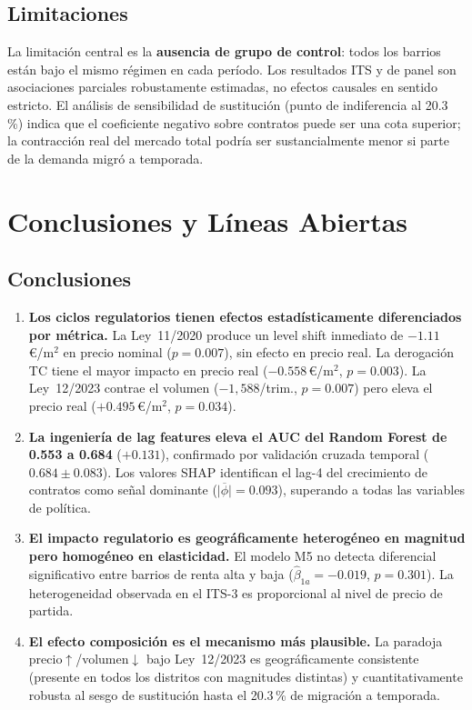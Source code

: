 \documentclass[10pt,a4paper,twocolumn]{article}
\begin{document}
\subsection{Limitaciones}

La limitación central es la \textbf{ausencia de grupo de control}: todos los barrios
están bajo el mismo régimen en cada período. Los resultados ITS y de panel son
asociaciones parciales robustamente estimadas, no efectos causales en sentido estricto.
El análisis de sensibilidad de sustitución (punto de indiferencia al 20.3\,\%) indica
que el coeficiente negativo sobre contratos puede ser una cota superior; la contracción
real del mercado total podría ser sustancialmente menor si parte de la demanda migró
a temporada.

\section{Conclusiones y Líneas Abiertas}
\label{sec:conclusiones}

\subsection{Conclusiones}

\begin{enumerate}[leftmargin=*,label=\textbf{C\arabic*.},itemsep=3pt]

\item \textbf{Los ciclos regulatorios tienen efectos estadísticamente diferenciados
por métrica.} La Ley~11/2020 produce un level shift inmediato de $-1.11$\,\euro/m$^2$
en precio nominal ($p{=}0.007$), sin efecto en precio real. La derogación TC tiene el
mayor impacto en precio real ($-0.558$\,\euro/m$^2$, $p{=}0.003$). La Ley~12/2023
contrae el volumen ($-1{,}588$/trim., $p{=}0.007$) pero eleva el precio real
($+0.495$\,\euro/m$^2$, $p{=}0.034$).

\item \textbf{La ingeniería de lag features eleva el AUC del Random Forest de 0.553
a 0.684} ($+0.131$), confirmado por validación cruzada temporal ($0.684\pm 0.083$).
Los valores SHAP identifican el lag-4 del crecimiento de contratos como señal
dominante ($\overline{|\phi|}{=}0.093$), superando a todas las variables de política.

\item \textbf{El impacto regulatorio es geográficamente heterogéneo en magnitud pero
homogéneo en elasticidad.} El modelo M5 no detecta diferencial significativo entre
barrios de renta alta y baja ($\hat\beta_{1a}{=}{-}0.019$, $p{=}0.301$). La
heterogeneidad observada en el ITS-3 es proporcional al nivel de precio de partida.

\item \textbf{El efecto composición es el mecanismo más plausible.} La paradoja
precio$\uparrow$/volumen$\downarrow$ bajo Ley~12/2023 es geográficamente consistente
(presente en todos los distritos con magnitudes distintas) y cuantitativamente robusta
al sesgo de sustitución hasta el 20.3\,\% de migración a temporada.

\end{enumerate}
\end{document}

